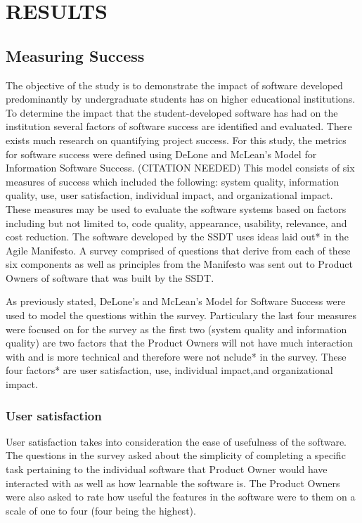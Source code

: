 
\section{RESULTS}
\subsection{Measuring Success}

The objective of the study is to demonstrate the impact of software developed predominantly by undergraduate students has on higher educational institutions. To determine the impact that the student-developed software has had on the institution several factors of software success are identified and evaluated.  There exists much research on quantifying project success. For this study, the metrics for software success were defined using DeLone and McLean’s Model for Information Software Success. (CITATION NEEDED) This model consists of six measures of success which included the following: system quality, information quality, use, user satisfaction, individual impact, and organizational impact. These measures may be used to evaluate the software systems based on factors including but not limited to, code quality, appearance, usability, relevance, and cost reduction. The software developed by the SSDT uses ideas laid out* in the Agile Manifesto. A survey comprised of questions that derive from each of these six components as well as principles from the Manifesto was sent out to Product Owners of software that was built by the SSDT.

As previously stated, DeLone's and McLean's Model for Software Success were used to model the questions within the survey. Particulary the last four measures were focused on for the survey as the first two (system quality and information quality) are two factors that the Product Owners will not have much interaction with and is more technical and therefore were not nclude* in the survey. These four factors* are user satisfaction, use, individual impact,and organizational impact.

\subsubsection{User satisfaction}
User satisfaction takes into consideration the ease of usefulness of the software. The questions in the survey asked about the simplicity of completing a specific task pertaining to the individual software that Product Owner would have interacted with as well as how learnable the software is. The Product Owners were also asked to rate how useful the features in the software were to them on a scale of one to four (four being the highest).

